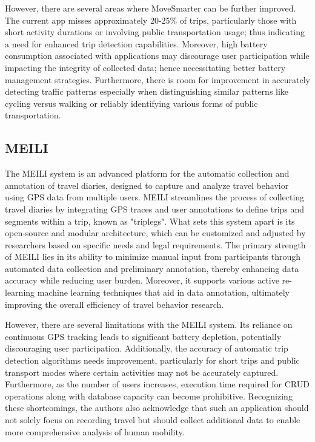\documentclass[12pt,two side]{report}
\begin{document}
However, there are several areas where MoveSmarter can be further improved. The current app misses approximately 20-25\% of trips, particularly those with short activity durations or involving public transportation usage; thus indicating a need for enhanced trip detection capabilities\cite{geurs2015automatic}. Moreover, high battery consumption associated with applications may discourage user participation while impacting the integrity of collected data; hence necessitating better battery management strategies\cite{geurs2015automatic}. Furthermore, there is room for improvement in accurately detecting traffic patterns especially when distinguishing similar patterns like cycling versus walking or reliably identifying various forms of public transportation\cite{geurs2015automatic}.

\subsection{MEILI}
The MEILI system is an advanced platform for the automatic collection and annotation of travel diaries, designed to capture and analyze travel behavior using GPS data from multiple users. MEILI streamlines the process of collecting travel diaries by integrating GPS traces and user annotations to define trips and segments within a trip, known as "triplegs". What sets this system apart is its open-source and modular architecture, which can be customized and adjusted by researchers based on specific needs and legal requirements. The primary strength of MEILI lies in its ability to minimize manual input from participants through automated data collection and preliminary annotation, thereby enhancing data accuracy while reducing user burden. Moreover, it supports various active re-learning machine learning techniques that aid in data annotation, ultimately improving the overall efficiency of travel behavior research.\newline

However, there are several limitations with the MEILI system. Its reliance on continuous GPS tracking leads to significant battery depletion, potentially discouraging user participation. Additionally, the accuracy of automatic trip detection algorithms needs improvement, particularly for short trips and public transport modes where certain activities may not be accurately captured. Furthermore, as the number of users increases, execution time required for CRUD operations along with database capacity can become prohibitive. Recognizing these shortcomings, the authors also acknowledge that such an application should not solely focus on recording travel but should collect additional data to enable more comprehensive analysis of human mobility.
\end{document}
